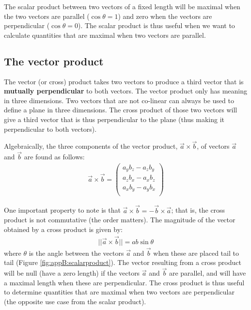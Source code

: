 
The scalar product between two vectors of a fixed length will be maximal when the two vectors are parallel ($\cos\theta=1$) and zero when the vectors are perpendicular ($\cos\theta =0$). The scalar product is thus useful when we want to calculate quantities that are maximal when two vectors are parallel. 


\subsection{The vector product}
The vector (or cross) product takes two vectors to produce a third vector that is \textbf{mutually perpendicular} to both vectors. The vector product only has meaning in three dimensions. Two vectors that are not co-linear can always be used to define a plane in three dimensions. The cross product of those two vectors will give a third vector that is thus perpendicular to the plane (thus making it perpendicular to both vectors). 

Algebraically, the three components of the vector product, $\vec a\times \vec b$, of vectors $\vec a$ and $\vec b$ are found as follows:
\begin{align}
\label{eqn:appB:crossproduct}
\vec a \times \vec b =\begin{pmatrix}
           a_yb_z - a_z b_y\\
           a_zb_x - a_x b_z\\
           a_xb_y - a_y b_x\\
         \end{pmatrix}
\end{align}

One important property to note is that $\vec a \times \vec b = -\vec b \times \vec a$; that is, the cross product is not commutative (the order matters). The magnitude of the vector obtained by a cross product is given by:
\begin{align}
\label{eqn:appB:crossproductmag}
||\vec a \times \vec b ||=ab\sin\theta
\end{align}
where $\theta$ is the angle between the vectors $\vec a$ and $\vec b$ when these are placed tail to tail (Figure \ref{fig:appB:scalarproduct}). The vector resulting from a cross product will be null (have a zero length) if the vectors $\vec a$ and $\vec b$ are parallel, and will have a maximal length when these are perpendicular. The cross product is thus useful to determine quantities that are maximal when two vectors are perpendicular (the opposite use case from the scalar product). 

